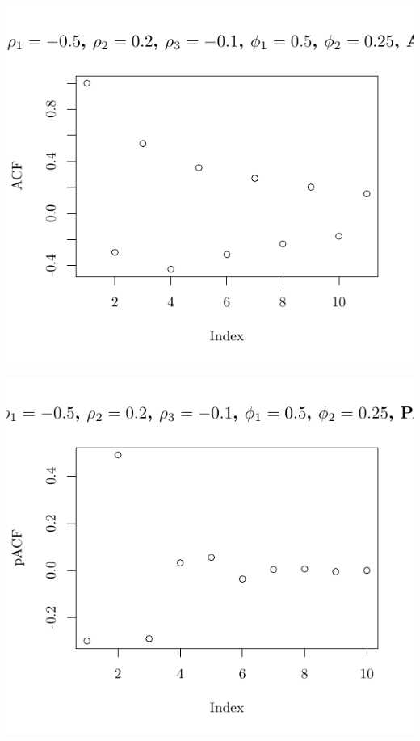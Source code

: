 \documentclass[10pt]{paper}\usepackage[]{graphicx}\usepackage[]{color}
\makeatletter
\def\maxwidth{ %
  \ifdim\Gin@nat@width>\linewidth
    \linewidth
  \else
    \Gin@nat@width
  \fi
}
\newenvironment{knitrout}{}{} %
\makeatother
\begin{document}
\begin{knitrout}
{\centering \includegraphics[width=\maxwidth]{figure/graphics-plotter-167} 

}




{\centering \includegraphics[width=\maxwidth]{figure/graphics-plotter-168} 

}





\end{knitrout}
\end{document}

